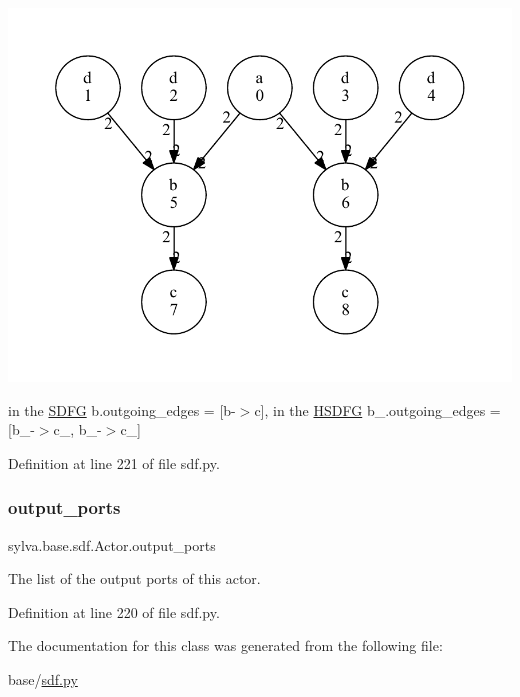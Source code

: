 \begin{DoxyImage}
\includegraphics[width=\textwidth,height=\textheight/2,keepaspectratio=true]{dot_HSDFG_example}
\end{DoxyImage}
 in the \hyperlink{classsylva_1_1base_1_1sdf_1_1_s_d_f_g}{S\+D\+FG} b.\+outgoing\+\_\+edges = \mbox{[}b-\/$>$c\mbox{]}, in the \hyperlink{classsylva_1_1base_1_1sdf_1_1_h_s_d_f_g}{H\+S\+D\+FG} b\+\_.\+outgoing\+\_\+edges = \mbox{[}b\+\_-\/$>$c\+\_, b\+\_-\/$>$c\+\_\mbox{]} 

Definition at line 221 of file sdf.\+py.

\mbox{\label{classsylva_1_1base_1_1sdf_1_1_actor_ac7e5ac2deece32b06b58a499a5dd0fee}} 
\subsubsection{\texorpdfstring{output\+\_\+ports}{output\_ports}}
{\footnotesize\ttfamily sylva.\+base.\+sdf.\+Actor.\+output\+\_\+ports}



The list of the output ports of this actor. 



Definition at line 220 of file sdf.\+py.



The documentation for this class was generated from the following file\+:\begin{DoxyCompactItemize}
\item 
base/\hyperlink{sdf_8py}{sdf.\+py}\end{DoxyCompactItemize}

